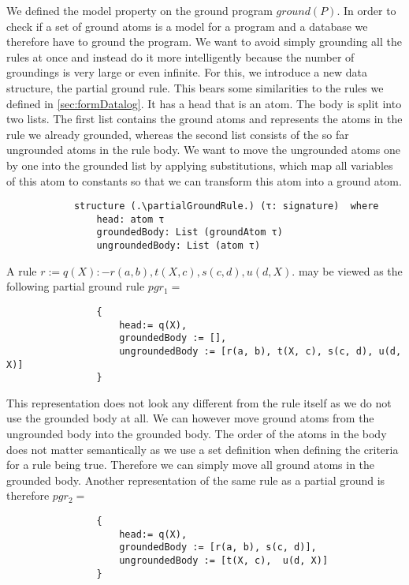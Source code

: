         We defined the model property on the ground program $ground(P)$. In order to check if a set of ground atoms is a model for a program and a database we therefore have to ground the program. We want to avoid simply grounding all the rules at once and instead do it more intelligently because the number of groundings is very large or even infinite.  For this, we introduce a new data structure, the partial ground rule. This bears some similarities to the rules we defined in \cref{sec:formDatalog}. It has a head that is an atom. The body is split into two lists. The first list contains the ground atoms and represents the atoms in the rule we already grounded, whereas the second list consists of the so far ungrounded atoms in the rule body. We want to move the ungrounded atoms one by one into the grounded list by applying substitutions, which map all variables of this atom to constants so that we can transform this atom into a ground atom.

        \begin{lstlisting}
            structure (.\partialGroundRule.) (τ: signature)  where
                head: atom τ
                groundedBody: List (groundAtom τ)
                ungroundedBody: List (atom τ)
        \end{lstlisting}

        \begin{example}
            A rule $r := q(X) :- r(a, b), t(X, c), s(c, d), u(d, X) .$ may be viewed as the following partial ground rule
            $pgr_1 = $
            \begin{lstlisting}
                {
                    head:= q(X),
                    groundedBody := [],
                    ungroundedBody := [r(a, b), t(X, c), s(c, d), u(d, X)]
                }
            \end{lstlisting}
            
            This representation does not look any different from the rule itself as we do not use the grounded body at all. We can however move ground atoms from the ungrounded body into the grounded body. The order of the atoms in the body does not matter semantically as we use a set definition when defining the criteria for a rule being true. Therefore we can simply move all ground atoms in the grounded body. Another representation of the same rule as a partial ground is therefore $pgr_2=$

            \begin{lstlisting}
                {
                    head:= q(X),
                    groundedBody := [r(a, b), s(c, d)],
                    ungroundedBody := [t(X, c),  u(d, X)]
                }
            \end{lstlisting}

        \end{example}

